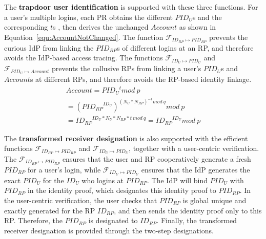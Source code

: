 The \textbf{trapdoor user identification} is supported with these three functions.
For a user's multiple logins, each PR obtains the different $PID_U$s and the corresponding $t$s , then derives the unchanged $Account$  as shown in Equation~\ref{equ:AccountNotChanged}.
The function $\mathcal{F}_{ID_{RP} \mapsto PID_{RP}}$ prevents the curious IdP from linking the $PID_{RP}$s of different logins at an RP, and therefore avoids  the  IdP-based access tracing.
The functions $\mathcal{F}_{ID_{U} \mapsto PID_{U}}$ and $\mathcal{F}_{PID_{U} \mapsto Account}$ prevents the collusive RPs from linking a user's $PID_U$s and $Account$s at different RPs, and therefore avoids the RP-based identity linkage.
 \begin{multline}\label{equ:AccountNotChanged}
   Account =  {PID_{U}}^{t} mod \ p  \\
   = {({PID_{RP}}^{ID_U})}^{{(N_U*N_{RP})^{-1} mod \ q}} mod \ p \\
   = {ID_{RP}} ^ {ID_U * N_U * N_{RP} *t\ mod\ q} = {ID_{RP}}^{ID_U} mod \ p
 \end{multline}

The \textbf{transformed receiver designation} is also supported with the efficient functions $\mathcal{F}_{ID_{RP} \mapsto PID_{RP}}$ and $\mathcal{F}_{ID_{U} \mapsto PID_{U}}$, together with  a user-centric verification.
The $\mathcal{F}_{ID_{RP} \mapsto PID_{RP}}$ ensures that the user and RP cooperatively generate a fresh $PID_{RP}$  for a user's login,
 while $\mathcal{F}_{ID_{U} \mapsto PID_{U}}$ ensures that the IdP generates the exact $PID_U$ for the $ID_U$ who logins at $PID_{RP}$.
The IdP will bind $PID_{U}$ with $PID_{RP}$ in the identity proof, which designates this identity proof to $PID_{RP}$.
In the user-centric verification,  the user checks that $PID_{RP}$ is global unique and exactly generated for the RP $ID_{RP}$,
 and then sends the identity proof  only  to this RP. Therefore, the $PID_{RP}$ is designated to $ID_{RP}$.
Finally, the transformed receiver designation is provided through the two-step designations.


